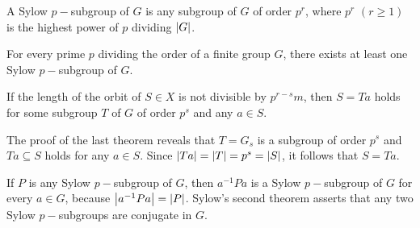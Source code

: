 \documentclass[../main-sheet.tex]{subfiles}
\begin{document}
\begin{defn}
    A Sylow \(p-\)subgroup of \(G\) is any subgroup of \(G\) of order \(p^r\), where \(p^r\) \((r \geq 1)\) is the highest power of \(p\) dividing \(\left\vert G\right\vert\).
\end{defn}
\begin{cor}
For every prime \(p\) dividing the order of a finite group \(G\), there exists at
least one Sylow \(p-\)subgroup of \(G\).
\end{cor}
\begin{cor}\label{cor:10.5}
If the length of the orbit of \(S \in X\) is not divisible by \(p^{r-s}m\), then \(S=Ta\)
holds for some subgroup \(T\) of \(G\) of order \(p^s\) and any \(a \in S\).
\end{cor}
The proof of the last theorem reveals that \(T = G_s\) is a subgroup of order \(p^s\) and \(Ta\subseteq S\)
holds for any \(a \in S\). Since \(\left\vert Ta\right\vert=\left\vert T\right\vert=p^s=\left\vert S\right\vert\), it follows that \(S=Ta\).


If \(P\) is any Sylow \(p-\)subgroup of \(G \), then \(a^{-1}Pa\) is a Sylow \(p-\)subgroup of \(G\) for every
\(a \in G \), because \(\left\vert a^{-1} Pa\right\vert = \left\vert P\right\vert\).
Sylow's second theorem asserts that any two Sylow \(p-\)subgroups are conjugate in \(G\).
\end{document}
